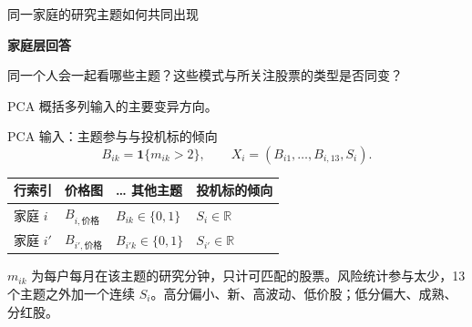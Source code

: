 \begin{frame}[label=pc-why]{同一家庭的研究主题如何共同出现}
  {\textbf{家庭层回答}\par\small
    同一个人会一起看哪些主题？这些模式与所关注股票的类型是否同变？\par
    PCA 概括多列输入的主要变异方向。}
  \medskip
\end{frame}

\begin{frame}[label=pc-input]{PCA 输入：主题参与与投机标的倾向}
  \[
    B_{ik}=\mathbf{1}\{m_{ik}>2\},
    \qquad X_i=(B_{i1},\ldots,B_{i,13},S_i).
  \]
  \small
  \begin{tabularx}{\linewidth}{@{}L{.23\linewidth}YYY@{}}
    \toprule 行索引 & 价格图 & … 其他主题 & 投机标的倾向\\\midrule
    家庭 \(i\) & \(B_{i,\text{价格}}\) & \(B_{ik}\in\{0,1\}\) & \(S_i\in\mathbb R\)\\
    家庭 \(i'\) & \(B_{i',\text{价格}}\) & \(B_{i'k}\in\{0,1\}\) & \(S_{i'}\in\mathbb R\)\\\bottomrule
  \end{tabularx}\par\medskip
  \(m_{ik}\) 为每户每月在该主题的研究分钟，只计可匹配的股票。风险统计参与太少，13 个主题之外加一个连续 \(S_i\)。高分偏小、新、高波动、低价股；低分偏大、成熟、分红股。
  \small{}
\end{frame}


